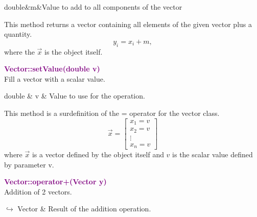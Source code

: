 \begin{tcolorbox}[width=\textwidth,myArgs,tabularx={ll|R}]
double&m&Value to add to all components of the vector
\end{tcolorbox}

This method returns a vector containing all elements of the given vector plus a quantity.
\begin{equation*}
y_i = x_i + m,
\end{equation*}
where the $\overrightarrow{x}$ is the object itself.

\textcolor{purple}{\textbf{Vector::setValue(double v)}}\label{Vector::setValue(double v)}\\
Fill a vector with a scalar value.

\begin{tcolorbox}[width=\textwidth,myArgs,tabularx={ll|R}]
double & v & Value to use for the operation.
\end{tcolorbox}

This method is a surdefinition of the = operator for the vector class.
\begin{equation*}
\overrightarrow{x}=\left[\begin{array}{c}
  x_{1}=v\\
  x_{2}=v\\
  \vdots\\
  x_{n}=v
  \end{array}\right]
\end{equation*}
where $\overrightarrow{x}$ is a vector defined by the object itself and $v$ is the scalar value defined by parameter v.

\textcolor{purple}{\textbf{Vector::operator+(Vector y)}}\label{Vector::operator+(Vector y)}\\
Addition of 2 vectors.\vspace*{-0.5em}
\begin{tcolorbox}[grow to left by=-1cm, width=\textwidth-1cm,myArgs,tabularx={l|R}]
$\hookrightarrow$ Vector & Result of the addition operation.
\end{tcolorbox}

